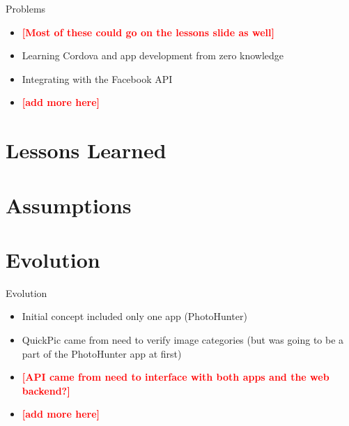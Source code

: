 \documentclass[aspectratio=169]{beamer}
\newcommand{\todo}[1]{\textcolor{red}{\textbf{[#1]}}}
\begin{document}
\begin{frame}{Problems}
	\begin{itemize}

		\item \todo{Most of these could go on the lessons slide as well}

		\item Learning Cordova and app development from zero knowledge

		\item Integrating with the Facebook API

		\item \todo{add more here}

	\end{itemize}
\end{frame}

\section{Lessons Learned}

\section{Assumptions}

\section{Evolution}

\begin{frame}{Evolution}
	\begin{itemize}

		\item Initial concept included only one app (PhotoHunter)

		\item QuickPic came from need to verify image categories (but was going to
					be a part of the PhotoHunter app at first)

		\item \todo{API came from need to interface with both apps and the web backend?}

		\item \todo{add more here}

	\end{itemize}
\end{frame}
\end{document}
